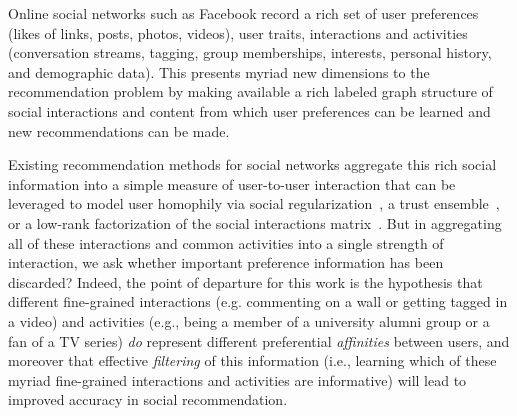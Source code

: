 
\label{sec:introduction}

Online social networks such as Facebook record a rich set of user
preferences (likes of links, posts, photos, videos), user traits,
interactions and activities (conversation streams, tagging, group
memberships, interests, personal history, and demographic data).  This
presents myriad new dimensions to the recommendation problem by making
available a rich labeled graph structure of social interactions and
content from which user preferences can be learned and new
recommendations can be made.

Existing recommendation methods for social networks aggregate this
rich social information into a simple measure of user-to-user interaction 
that can be leveraged to model user homophily via social
regularization~\cite{socinf,rrmf,sr,Noel2012NOF,lla}, a trust
ensemble~\cite{ste}, or a low-rank factorization of the social
interactions matrix~\cite{sorec}.  But in aggregating all of these
interactions and common activities into a single strength of
interaction, we 
ask whether important preference information has been discarded?
Indeed, the point of departure for this work is the hypothesis that
different fine-grained interactions (e.g. commenting on a wall or
getting tagged in a video) and activities (e.g., being a member of a
university alumni group or a fan of a TV series) \emph{do} represent
different preferential {\em affinities} between users, and moreover
that effective {\em filtering} of this information (i.e., learning
which of these myriad fine-grained interactions and activities are 
informative) will lead to improved accuracy in social recommendation.


